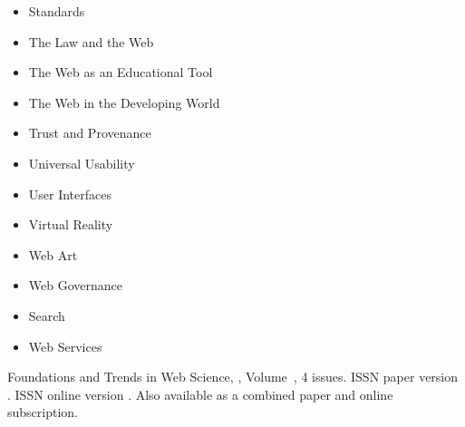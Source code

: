 {\begin{multicols}{2}
\begin{itemize}
    \item{Standards}
    \item{The Law and the Web}
    \item{The Web as an Educational Tool}
    \item{The Web in the Developing World}
    \item{Trust and Provenance}
    \item{Universal Usability}
    \item{User Interfaces}
    \item{Virtual Reality}
    \item{Web Art}
    \item{Web Governance}
    \item{Search}
    \item{Web Services}
\end{itemize}
\end{multicols}
 }

\journallibraryinfo
 {%
  Foundations and Trends\textsuperscript{\textregistered} in
  Web Science, ,
  Volume~, 4 issues.
  ISSN paper version .
  ISSN online version .
  Also available as a combined paper and online
  subscription.
 } 